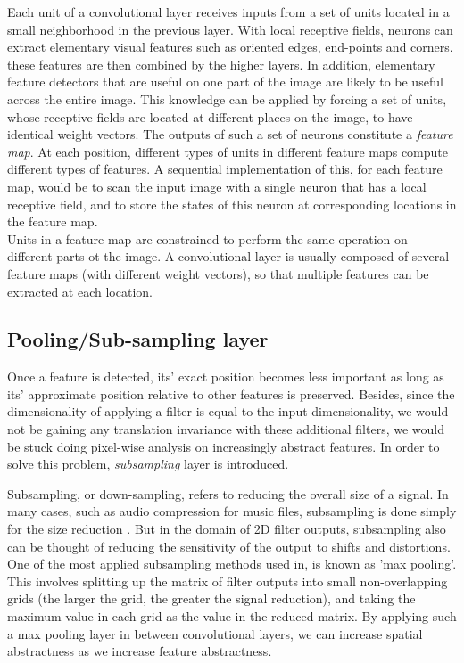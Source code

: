  Each unit of a convolutional layer receives inputs from a set of units located in a small neighborhood in the previous layer. With local receptive fields, neurons can extract elementary visual features such as oriented edges, end-points and corners. these features are then combined by the higher layers\cite{lecun2010convolutional}. In addition, elementary feature detectors that are useful on one part of the image are likely to be useful across the entire image. This knowledge can be applied by forcing a set of units, whose receptive fields are located at different places on the image, to have identical weight vectors\cite{williams1986learning}. The outputs of such a set of neurons constitute a \textit{feature map}. At each position, different types of units in different feature maps compute different types of features. A sequential implementation of this, for each feature map, would be to scan the input image with a single neuron that has a local receptive field, and to store the states of this neuron at corresponding locations in the feature map\cite{lecun2010convolutional}. \\
\indent Units in a feature map are constrained to perform the same operation on different parts ot the image. A convolutional layer is usually composed of several feature maps (with different weight vectors), so that multiple features can be extracted at each location. 

\subsection{Pooling/Sub-sampling layer}
Once a feature is detected, its' exact position becomes less important as long as its' approximate position relative to other features is preserved. Besides, since the dimensionality of applying a filter is equal to the input dimensionality, we would not be gaining any translation invariance with these additional filters, we would be stuck doing pixel-wise analysis on increasingly abstract features. In order to solve this problem, \textit{subsampling} layer is introduced.

 Subsampling, or down-sampling, refers to reducing the overall size of a signal. In many cases, such as audio compression for music files, subsampling is done simply for the size reduction \cite{sub}. But in the domain of 2D filter outputs, subsampling also can be thought of reducing the sensitivity of the output to shifts and distortions. One of the most applied subsampling methods used in\cite{lecun1995comparison}, is known as 'max pooling'. This involves splitting up the matrix of filter outputs into small non-overlapping grids (the larger the grid, the greater the signal reduction), and taking the maximum value in each grid as the value in the reduced matrix. By applying such a max pooling layer in between convolutional layers, we can increase spatial abstractness as we increase feature abstractness\cite{sub}.

